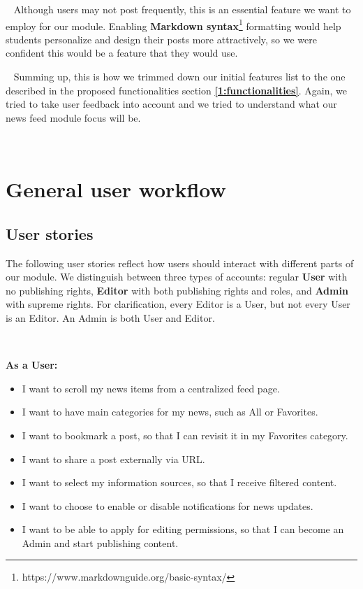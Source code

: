 ~
Although users may not post frequently, this is an essential feature we want to employ for our module. Enabling \textbf{Markdown syntax}\footnote{https://www.markdownguide.org/basic-syntax/} formatting would help students personalize and design their posts more attractively, so we 
were confident this would be a feature that they would use.

~
Summing up, this is how we trimmed down our initial features list to the one described in the proposed functionalities section \textbf{\ref{1:functionalities}}. Again, we tried to take user feedback into account and we tried to understand what our news feed module focus will be. 

~

\section{General user workflow} \label{4:general_user_workflow}

\subsection{User stories} \label{4:user_stories}

The following user stories reflect how users should interact with different parts of our module. We distinguish between three types of accounts: regular \textbf{User} with no publishing rights, \textbf{Editor} with both publishing rights and roles, and \textbf{Admin} with supreme rights. For clarification, every Editor is a User, but not every User is an Editor. An Admin is both User and Editor.

~

\textbf{As a User:}
\begin{itemize}
    \setlength{\topsep}{0.5pt}
    \setlength{\itemsep}{0.5pt}
    \setlength{\parsep}{0.5pt}
    \item I want to scroll my news items from a centralized feed page.
    \item I want to have main categories for my news, such as All or Favorites.
    \item I want to bookmark a post, so that I can revisit it in my Favorites category.
    \item I want to share a post externally via URL.
    \item I want to select my information sources, so that I receive filtered content.
    \item I want to choose to enable or disable notifications for news updates.
    \item I want to be able to apply for editing permissions, so that I can become an Admin and start publishing content.
\end{itemize}

